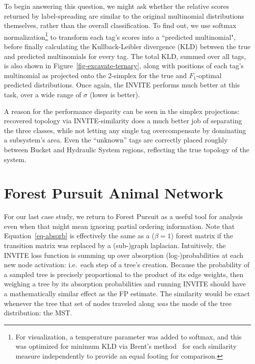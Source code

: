 \documentclass[%
	12pt,
		oneside,
		letterpaper
]{book}
\begin{document}
To begin answering this question, we might ask whether the relative
scores returned by label-spreading are similar to the original
multinomial distributions themselves, rather than the overall
classification. To find out, we use softmax normalization\footnote{For
  visualization, a temperature parameter was added to softmax, and this
  was optimized for minimum KLD via Brent's
  method~\autocite{algorithmguaranteedconvergence_Brent1971} for each
  similarity measure independently to provide an equal footing for
  comparison.} to transform each tag's scores into a ``predicted
multinomial", before finally calculating the Kullback-Leibler divergence
(KLD) between the true and predicted multinomials for every tag. The
total KLD, summed over all tags, is also shown in
Figure~\ref{fig-excavate-ternary}, along with positions of each tag's
multinomial as projected onto the 2-simplex for the true and
\(F_1\)-optimal predicted distributions. Once again, the INVITE performs
much better at this task, over a wide range of \(\sigma\) (lower is
better).

A reason for the performance disparity can be seen in the simplex
projections: recovered topology via INVITE-similarity does a much better
job of separating the three classes, while not letting any single tag
overcompensate by dominating a subsystem's area. Even the ``unknown''
tags are correctly placed roughly between Bucket and Hydraulic System
regions, reflecting the true topology of the system.

\section{Forest Pursuit Animal
Network}\label{forest-pursuit-animal-network}

For our last case study, we return to Forest Pursuit as a useful tool
for analysis even when that might mean ignoring partial ordering
information. Note that Equation~\ref{eq-absorb} is effectively the same
as a (\(\beta=1\)) forest matrix if the transition matrix was replaced
by a (sub-)graph laplacian. Intuitively, the INVITE loss function is
summing up over absorption (log-)probabilities at each new node
activation: i.e.~each step of a tree's creation. Because the probability
of a sampled tree is precisely proportional to the product of its edge
weights, then weighing a tree by its absorption probabilities and
running INVITE should have a mathematically similar effect as the FP
estimate. The similarity would be exact whenever the tree that set of
nodes traveled along \emph{was} the mode of the tree distribution: the
MST.
\end{document}
